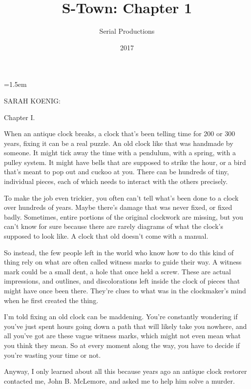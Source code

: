 \documentclass[10pt,a4paper]{article}
\newcommand{\speakerlabel}[1]{{\plantin\color{speakerblue}\MakeUppercase{#1}:}}
\newenvironment{speech}[1]{%
		\par\medskip
		\begin{list}{}{%
			\leftmargin=1.5em
			\rightmargin=0pt
			\topsep=0pt
			\partopsep=0pt
			\parsep=0.5\baselineskip
			\itemsep=0pt}%
		\item\speakerlabel{#1}\enspace\ignorespaces
	}{\end{list}}
\newenvironment{narration}[1]{%
		\par\medskip\noindent\speakerlabel{#1}\enspace\ignorespaces
	}{\par\medskip}
\begin{document}
\title{S-Town: Chapter 1}
\date{2017}
\author{Serial Productions}
\maketitle
    
\thispagestyle{plain}
\setcounter{page}{1}
\linenumbers
\begin{speech}{SARAH KOENIG}
Chapter I.
\end{speech}
\begin{narration}{BRIAN REED}
When an antique clock breaks, a clock that's been telling time for 200 or 300 years, fixing it can be a real puzzle. An old clock like that was handmade by someone. It might tick away the time with a pendulum, with a spring, with a pulley system. It might have bells that are supposed to strike the hour, or a bird that's meant to pop out and cuckoo at you. There can be hundreds of tiny, individual pieces, each of which needs to interact with the others precisely.

To make the job even trickier, you often can't tell what's been done to a clock over hundreds of years. Maybe there's damage that was never fixed, or fixed badly. Sometimes, entire portions of the original clockwork are missing, but you can't know for sure because there are rarely diagrams of what the clock's supposed to look like. A clock that old doesn't come with a manual.

So instead, the few people left in the world who know how to do this kind of thing rely on what are often called witness marks to guide their way. A witness mark could be a small dent, a hole that once held a screw. These are actual impressions, and outlines, and discolorations left inside the clock of pieces that might have once been there. They're clues to what was in the clockmaker's mind when he first created the thing.

I'm told fixing an old clock can be maddening. You're constantly wondering if you've just spent hours going down a path that will likely take you nowhere, and all you've got are these vague witness marks, which might not even mean what you think they mean. So at every moment along the way, you have to decide if you're wasting your time or not.

Anyway, I only learned about all this because years ago an antique clock restorer contacted me, John B. McLemore, and asked me to help him solve a murder.
\end{narration}
\end{document}
